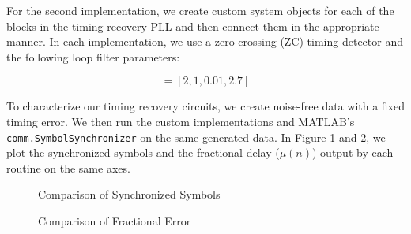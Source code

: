 \documentclass{article}
\begin{document}
\noindent For the second implementation, we create custom system objects for each of the blocks in the timing recovery PLL and then connect them in the appropriate manner. In each implementation, we use a zero-crossing (ZC) timing detector and the following loop filter parameters:

\begin{equation*}
	[N, \zeta, B_{loop}, G_D] = [2, 1, 0.01, 2.7]
\end{equation*}

\noindent To characterize our timing recovery circuits, we create noise-free data with a fixed timing error. We then run the custom implementations and MATLAB's \texttt{comm.SymbolSynchronizer} on the same generated data. In Figure \ref{fig::symbol_sync_no_noise} and \ref{fig::fractional_error_no_noise}, we plot the synchronized symbols and the fractional delay ($\mu(n)$) output by each routine on the same axes.

\begin{figure}[H]
	\centerline{}
	\caption{Comparison of Synchronized Symbols}
	\label{fig::symbol_sync_no_noise}
\end{figure}

\begin{figure}[H]
	\centerline{}
	\caption{Comparison of Fractional Error}
	\label{fig::fractional_error_no_noise}
\end{figure}
\end{document}
